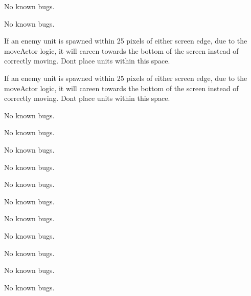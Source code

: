 
\begin{DoxyRefList}
\item[\label{bug__bug000001}%
\hypertarget{bug__bug000001}{}%
File \hyperlink{actor_8cpp}{actor.cpp} ]No known bugs.  
\item[\label{bug__bug000002}%
\hypertarget{bug__bug000002}{}%
File \hyperlink{actor_8h}{actor.h} ]No known bugs.  
\item[\label{bug__bug000003}%
\hypertarget{bug__bug000003}{}%
File \hyperlink{actor_enemy_basic_8cpp}{actor\+Enemy\+Basic.cpp} ]If an enemy unit is spawned within 25 pixels of either screen edge, due to the move\+Actor logic, it will careen towards the bottom of the screen instead of correctly moving. Don\textquotesingle{}t place units within this space.  
\item[\label{bug__bug000004}%
\hypertarget{bug__bug000004}{}%
File \hyperlink{actor_enemy_basic_8h}{actor\+Enemy\+Basic.h} ]If an enemy unit is spawned within 25 pixels of either screen edge, due to the move\+Actor logic, it will careen towards the bottom of the screen instead of correctly moving. Don\textquotesingle{}t place units within this space.  
\item[\label{bug__bug000005}%
\hypertarget{bug__bug000005}{}%
File \hyperlink{actor_player_8cpp}{actor\+Player.cpp} ]No known bugs.  
\item[\label{bug__bug000006}%
\hypertarget{bug__bug000006}{}%
File \hyperlink{actor_player_8h}{actor\+Player.h} ]No known bugs.  
\item[\label{bug__bug000007}%
\hypertarget{bug__bug000007}{}%
File \hyperlink{bullet_8h}{bullet.h} ]No known bugs. 

No known bugs.  
\item[\label{bug__bug000009}%
\hypertarget{bug__bug000009}{}%
File \hyperlink{_hitbox_8cpp}{Hitbox.cpp} ]No known bugs.  
\item[\label{bug__bug000010}%
\hypertarget{bug__bug000010}{}%
File \hyperlink{_hitbox_8h}{Hitbox.h} ]No known bugs.  
\item[\label{bug__bug000011}%
\hypertarget{bug__bug000011}{}%
File \hyperlink{main_8cpp}{main.cpp} ]No known bugs.  
\item[\label{bug__bug000012}%
\hypertarget{bug__bug000012}{}%
File \hyperlink{object_spawners_8cpp}{object\+Spawners.cpp} ]No known bugs.  
\item[\label{bug__bug000013}%
\hypertarget{bug__bug000013}{}%
File \hyperlink{object_spawners_8h}{object\+Spawners.h} ]No known bugs.  
\item[\label{bug__bug000014}%
\hypertarget{bug__bug000014}{}%
File \hyperlink{projectile_8cpp}{projectile.cpp} ]No known bugs.  
\item[\label{bug__bug000015}%
\hypertarget{bug__bug000015}{}%
File \hyperlink{projectile_8h}{projectile.h} ]No known bugs. 
\end{DoxyRefList}
